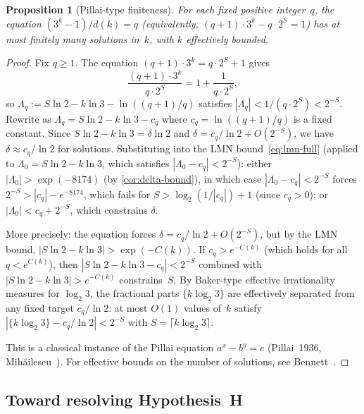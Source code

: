 \documentclass[11pt, a4paper]{amsart}
\theoremstyle{plain}
\newtheorem{proposition}[theorem]{Proposition}
\theoremstyle{definition}
\theoremstyle{remark}
\begin{document}
\begin{proposition}[Pillai-type finiteness]\label{prop:pillai}
  For each fixed positive integer~$q$, the equation
  $(3^k - 1)/d(k) = q$ (equivalently,
  $(q+1) \cdot 3^k - q \cdot 2^S = 1$)
  has at most finitely many solutions in~$k$, with
  $k$ effectively bounded.
\end{proposition}

\begin{proof}
  Fix $q \geq 1$.  The equation $(q+1) \cdot 3^k = q \cdot 2^S + 1$
  gives
  \[
    \frac{(q+1) \cdot 3^k}{q \cdot 2^S} = 1 + \frac{1}{q \cdot 2^S},
  \]
  so $\Lambda_q := S \ln 2 - k \ln 3 - \ln((q+1)/q)$
  satisfies $|\Lambda_q| < 1/(q \cdot 2^S) < 2^{-S}$.
  Rewrite as $\Lambda_q = S \ln 2 - k \ln 3 - c_q$ where
  $c_q = \ln((q+1)/q)$ is a fixed constant.
  Since $S \ln 2 - k \ln 3 = \delta \ln 2$ and
  $\delta = c_q/\ln 2 + O(2^{-S})$, we have
  $\delta \approx c_q/\ln 2$ for solutions.
  Substituting into the LMN bound~\eqref{eq:lmn-full}
  (applied to $\Lambda_0 = S \ln 2 - k \ln 3$,
  which satisfies $|\Lambda_0 - c_q| < 2^{-S}$):
  either $|\Lambda_0| > \exp(-8174)$ (by \cref{cor:delta-bound}),
  in which case $|\Lambda_0 - c_q| < 2^{-S}$ forces
  $2^{-S} > |c_q| - e^{-8174}$, which fails for
  $S > \log_2(1/|c_q|) + 1$ (since $c_q > 0$);
  or $|\Lambda_0| < c_q + 2^{-S}$, which constrains $\delta$.

  More precisely: the equation forces $\delta = c_q/\ln 2 + O(2^{-S})$,
  but by the LMN bound, $|S\ln 2 - k \ln 3| > \exp(-C(k))$.
  If $c_q > e^{-C(k)}$ (which holds for all
  $q < e^{C(k)}$), then
  $|S\ln 2 - k \ln 3 - c_q| < 2^{-S}$ combined with
  $|S\ln 2 - k \ln 3| > e^{-C(k)}$ constrains~$S$.
  By Baker-type effective irrationality measures
  for $\log_2 3$, the fractional parts
  $\{k \log_2 3\}$ are effectively separated from
  any fixed target $c_q / \ln 2$: at most $O(1)$
  values of~$k$ satisfy
  $|\{k \log_2 3\} - c_q/\ln 2| < 2^{-S}$ with
  $S = \lceil k \log_2 3 \rceil$.

  This is a classical instance of the Pillai equation
  $a^x - b^y = c$
  (Pillai~1936, Mih\u{a}ilescu~\cite{Mihailescu2004}).
  For effective bounds on the number of solutions, see
  Bennett~\cite{Bennett2003}.
\end{proof}

\subsection{Toward resolving Hypothesis~H}\label{ssec:closing-H}
\end{document}
